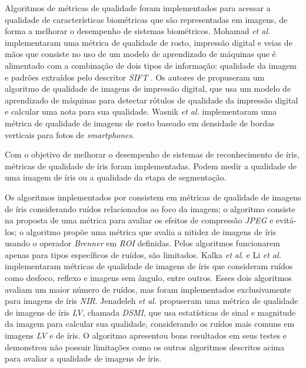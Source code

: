 \par Algoritmos de métricas de qualidade foram implementados para acessar a qualidade de características biométricas que são representadas em imagens, de forma a melhorar o desempenho de sistemas biométricos. Mohamad \textit{et al.} \cite{mohamad2015} implementaram uma métrica de qualidade de rosto, impressão digital e veias de mãos que consiste no uso de um modelo de aprendizado de máquinas que é alimentado com a combinação de dois tipos de informação: qualidade da imagem e padrões extraídos pelo descritor \textit{\acrshort{SIFT}} \cite{lowe2004}. Os autores de \cite{sharma2017} propuseram um algoritmo de qualidade de imagens de impressão digital, que usa um modelo de aprendizado de máquinas para detectar rótulos de qualidade da impressão digital e calcular uma nota para sua qualidade. Wasnik \textit{et al.} \cite{wasnik2017} implementaram uma métrica de qualidade de imagens de rosto baseado em densidade de bordas verticais para fotos de \textit{smartphones}.

\par Com o objetivo de melhorar o desempenho de sistemas de reconhecimento de íris, métricas de qualidade de íris foram implementadas. Podem medir a qualidade de uma imagem de íris ou a qualidade da etapa de segmentação.

\par Os algoritmos implementados por \cite{daugman2004, starovoitov2013-DSMI-45, wan2007-DSMI-50} consistem em métricas de qualidade de imagens de íris considerando ruídos relacionados ao foco da imagem; o algoritmo \cite{bergmller2017-DSMI-2} consiste na proposta de uma métrica para avaliar os efeitos de compressão \textit{JPEG} e evitá-los; o algoritmo \cite{chen2013-DSMI-4} propõe uma métrica que avalia a nitidez de imagens de íris usando o operador \textit{Brenner} em \textit{\acrfull{ROI}} definidas. Pelos algoritmos \cite{daugman2004, starovoitov2013-DSMI-45, wan2007-DSMI-50,bergmller2017-DSMI-2,chen2013-DSMI-4} funcionarem apenas para tipos específicos de ruídos, são limitados. Kalka \textit{et al.} \cite{kalka2010-DSMI-18} e Li \textit{et al.} \cite{li2011} implementaram métricas de qualidade de imagens de íris que consideram ruídos como desfoco, reflexo e imagens sem ângulo, entre outros. Esses dois algoritmos avaliam um maior número de ruídos, mas foram implementados exclusivamente para imagens de íris \textit{\acrshort{NIR}}. Jenadeleh \textit{et al.} \cite{Jenadeleh_2018_CVPR_Workshops} propuseram uma métrica de qualidade de imagens de íris \textit{\acrshort{LV}}, chamada \textit{\acrshort{DSMI}}, que usa estatísticas de sinal e magnitude da imagem para calcular sua qualidade, considerando os ruídos mais comuns em imagens \textit{\acrshort{LV}} e de íris. O algoritmo apresentou bons resultados em seus testes e demonstrou não possuir limitações como os outros algoritmos descritos acima para avaliar a qualidade de imagens de íris.

